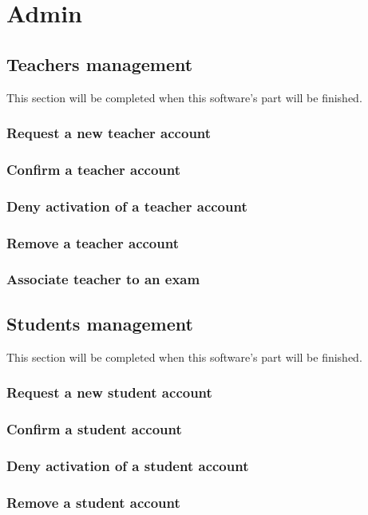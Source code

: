 \documentclass[ManualeUtente.tex]{subfiles}
\begin{document}
\chapter{Admin}

\section{Teachers management}
This section will be completed when this software's part will be finished.
\subsection{Request a new teacher account}
\subsection{Confirm a teacher account}
\subsection{Deny activation of a teacher account}
\subsection{Remove a teacher account}
\subsection{Associate teacher to an exam}

\section{Students management}
This section will be completed when this software's part will be finished.
\subsection{Request a new student account}
\subsection{Confirm a student account}
\subsection{Deny activation of a student account}
\subsection{Remove a student account}
\end{document}
